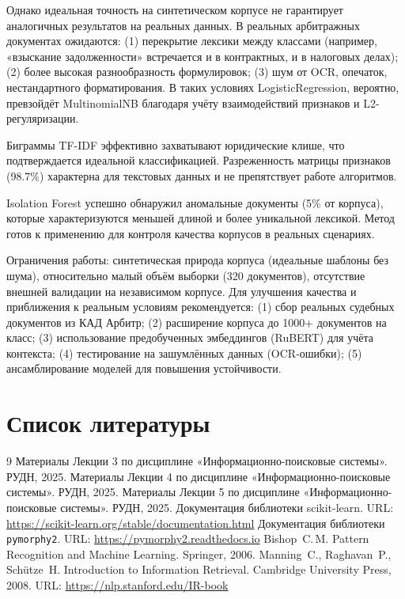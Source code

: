 \documentclass[12pt, a4paper]{report}
\begin{document}
Однако идеальная точность на синтетическом корпусе не гарантирует аналогичных
результатов на реальных данных. В реальных арбитражных документах ожидаются:
(1) перекрытие лексики между классами (например, «взыскание задолженности»
встречается и в контрактных, и в налоговых делах); (2) более высокая
разнообразность формулировок; (3) шум от OCR, опечаток, нестандартного
форматирования. В таких условиях LogisticRegression, вероятно, превзойдёт
MultinomialNB благодаря учёту взаимодействий признаков и L2-регуляризации.

Биграммы TF-IDF эффективно захватывают юридические клише, что подтверждается
идеальной классификацией. Разреженность матрицы признаков (98.7\%) характерна
для текстовых данных и не препятствует работе алгоритмов.

Isolation Forest успешно обнаружил аномальные документы (5\% от корпуса), которые
характеризуются меньшей длиной и более уникальной лексикой. Метод готов к
применению для контроля качества корпусов в реальных сценариях.

Ограничения работы: синтетическая природа корпуса (идеальные шаблоны без шума),
относительно малый объём выборки (320 документов), отсутствие внешней валидации
на независимом корпусе. Для улучшения качества и приближения к реальным условиям
рекомендуется: (1) сбор реальных судебных документов из КАД Арбитр; (2) расширение
корпуса до 1000+ документов на класс; (3) использование предобученных эмбеддингов
(RuBERT) для учёта контекста; (4) тестирование на зашумлённых данных (OCR-ошибки);
(5) ансамблирование моделей для повышения устойчивости.

\chapter*{Список литературы}

\begin{thebibliography}{9}
    Материалы Лекции 3 по дисциплине «Информационно-поисковые системы».
    РУДН, 2025.
    Материалы Лекции 4 по дисциплине «Информационно-поисковые системы».
    РУДН, 2025.
    Материалы Лекции 5 по дисциплине «Информационно-поисковые системы».
    РУДН, 2025.
    Документация библиотеки scikit-learn.
    URL: \url{https://scikit-learn.org/stable/documentation.html}
    Документация библиотеки \texttt{pymorphy2}.
    URL: \url{https://pymorphy2.readthedocs.io}
    Bishop~C.\,M. Pattern Recognition and Machine Learning. Springer, 2006.
    Manning~C., Raghavan~P., Schütze~H. Introduction to Information Retrieval.
    Cambridge University Press, 2008.
    URL: \url{https://nlp.stanford.edu/IR-book}
\end{thebibliography}
\end{document}
